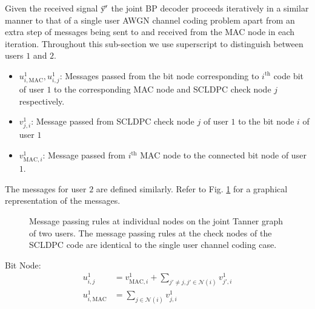 Given the received signal $\vec{\mathrm{y}}'$ the joint BP decoder proceeds iteratively in a similar manner to that of a single user AWGN channel coding problem apart from an extra step of messages being sent to and received from the MAC node in each iteration. Throughout this sub-section we use superscript to distinguish between users $1$ and $2$.
\begin{itemize}
\item $u^{1}_{i,\text{MAC}},u^{1}_{i,j}$: Messages passed from the bit node corresponding to $i^{\text{th}}$ code bit of user $1$ to the corresponding MAC node and  SCLDPC check node $j$ respectively.
\item $v^{1}_{j,i}$: Message passed from SCLDPC check node $j$ of user $1$ to the bit node $i$ of user $1$
\item $v^{1}_{\text{MAC},i}$: Message passed from $i^{\text{th}}$ MAC node to the connected bit node of user $1$.
\end{itemize}
The messages for user $2$ are defined similarly. Refer to Fig. \ref{fig:BP_computationgraph} for a graphical representation of the messages.

\begin{figure}[h!]
  \centering
  \resizebox{0.75\textwidth}{!}{}
  \caption{ Message passing rules at individual nodes on the joint Tanner graph of two users. The message passing rules at the check nodes of the SCLDPC code are identical to the single user channel coding case.}
  \label{fig:BP_computationgraph}
\end{figure}

Bit Node:
\begin{align*}
u^{1}_{i,j}&=v^{1}_{\text{MAC},i}+ \sum_{j'\neq j,j'\in \mathcal{N}(i)} v^{1}_{j',i}\\
u^{1}_{i,\text{MAC}}&=\sum_{j\in \mathcal{N}(i)} v^{1}_{j,i}
\end{align*}


